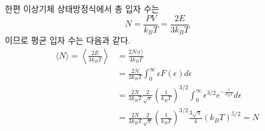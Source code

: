 \documentclass[a4paper,12pt]{report}
\begin{document}
	한편 이상기체 상태방정식에서 총 입자 수는 
	$$N=\frac{PV}{k_BT}=\frac{2E}{3k_BT}$$
	이므로 평균 입자 수는 다음과 같다. 
	\begin{equation*}
		\begin{split}
		\langle N\rangle=\left\langle \frac{2E}{3k_BT}\right\rangle&=\frac{2N\langle\epsilon\rangle}{3k_BT}\\
		&=\frac{2N}{3k_BT}\int_{0}^{\infty}\epsilon F(\epsilon) d\epsilon\\
		&=\frac{2N}{3k_BT}\frac{2}{\sqrt{\pi}}\left(\frac{1}{k_BT} \right) ^{3/2}\int_{0}^{\infty}\epsilon^{3/2}e^{-\frac{\epsilon}{k_BT}}d\epsilon\\
		&=\frac{2N}{3k_BT}\frac{2}{\sqrt{\pi}}\left(\frac{1}{k_BT} \right) ^{3/2}\frac{3\sqrt{\pi}}{4}(k_BT)^{5/2}=N
		\end{split}
	\end{equation*}
\end{document}
